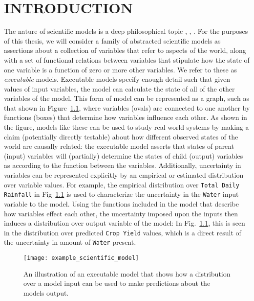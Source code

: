 \chapter{INTRODUCTION\label{chapter:introduction}}
The nature of scientific models is a deep philosophical topic \citep{giere2010explaining}, \citep{morrison2009models}, \citep{frigg2006models}.
For the purposes of this thesis, we will consider a family of abstracted scientific models as assertions about a collection of variables that refer to aspects of the world, along with a set of functional relations between variables that stipulate how the state of one variable is a function of zero or more other variables. We refer to these as {\em executable} models. Executable models specify enough detail such that given values of input variables, the model can calculate the state of all of the other variables of the model.
This form of model can be represented as a graph, such as that shown in Figure~\ref{fig:example_sci_model}, where variables (ovals) are connected to one another by functions (boxes) that determine how variables influence each other.
As shown in the figure, models like these can be used to study real-world systems by making a claim (potentially directly testable) about how different observed states of the world are causally related: the executable model asserts that states of parent (input) variables will (partially) determine the states of child (output) variables as according to the function between the variables.
Additionally, uncertainty in variables can be represented explicitly by an empirical or estimated distribution over variable values. For example, the empirical distribution over {\tt Total Daily Rainfall} in Fig~\ref{fig:example_sci_model} is used to characterize the uncertainty in the {\tt Water} input variable to the model.
Using the functions included in the model that describe how variables effect each other, the uncertainty imposed upon the inputs then induces a distribution over output variable of the model: In Fig.~\ref{fig:example_sci_model}, this is seen in the distribution over predicted {\tt Crop Yield} values, which is a direct result of the uncertainty in amount of {\tt Water} present.

\begin{figure}[!htbp]
  \centering
  \texttt{[image: example\_scientific\_model]}
  \caption[Example of a Scientific Model]{An illustration of an executable model that shows how a distribution over a model input can be used to make predictions about the models output.}
  \label{fig:example_sci_model}
\end{figure}

